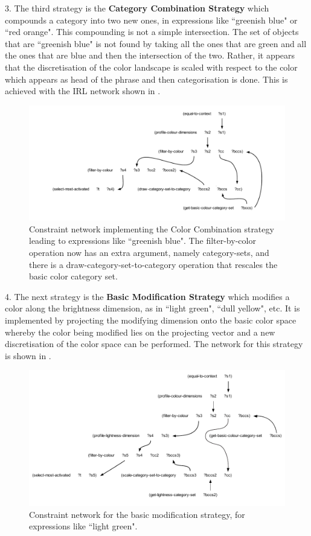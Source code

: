 3. The third strategy is the {\bf Category Combination Strategy} which compounds a category into two new ones, in 
expressions like ``greenish blue" or ``red orange". This compounding is not a simple intersection. The set of objects  
that are ``greenish blue" is not found by taking all the ones that are green and all the ones that are blue and then 
the intersection of the two. Rather, it appears that the discretisation of the color landscape is scaled with respect 
to the color which appears as head of the phrase and then categorisation is done. This is achieved with the IRL network 
shown in . 
\begin{figure}[htbp]
  \centerline{\includegraphics[width=1.0\textwidth]{chap11/figs/combi}}
\caption{\footnotesize\label{fig:combi} 
Constraint network implementing the Color Combination strategy leading to expressions like ``greenish blue". 
The filter-by-color operation now has an extra argument, namely category-sets,  
and there is a draw-category-set-to-category operation that rescales the basic color category set.}
\end{figure}

4. The next strategy is the {\bf Basic Modification Strategy} which modifies a color along the brightness dimension, as in 
``light green", ``dull yellow", etc. It is implemented by projecting the modifying dimension onto the basic color space 
whereby the color being modified lies on the projecting vector and a new discretisation of the color space can be 
performed. The network for this strategy is shown in . 
\begin{figure}[htbp]
  \centerline{\includegraphics[width=1.0\textwidth]{chap11/figs/modi}}
\caption{\footnotesize\label{fig:modi} 
Constraint network for the basic modification strategy, for expressions like ``light green".}
\end{figure}

